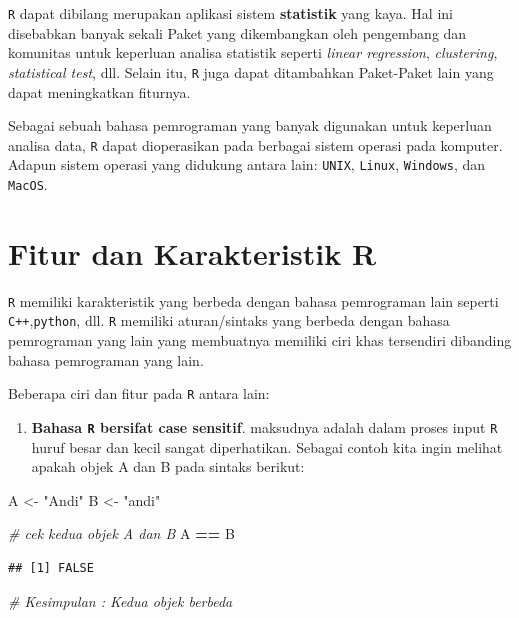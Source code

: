 \documentclass[]{book}
\newenvironment{Shaded}{\begin{snugshade}}{\end{snugshade}}
\newcommand{\CommentTok}[1]{\textcolor[rgb]{0.56,0.35,0.01}{\textit{#1}}}
\newcommand{\NormalTok}[1]{#1}
\newcommand{\OperatorTok}[1]{\textcolor[rgb]{0.81,0.36,0.00}{\textbf{#1}}}
\newcommand{\StringTok}[1]{\textcolor[rgb]{0.31,0.60,0.02}{#1}}
\providecommand{\tightlist}{%
  \setlength{\itemsep}{0pt}\setlength{\parskip}{0pt}}
\theoremstyle{definition}
\theoremstyle{definition}
\theoremstyle{definition}
\theoremstyle{remark}
\begin{document}
\texttt{R} dapat dibilang merupakan aplikasi sistem \textbf{statistik} yang kaya. Hal ini disebabkan banyak sekali Paket yang dikembangkan oleh pengembang dan komunitas untuk keperluan analisa statistik seperti \emph{linear regression}, \emph{clustering}, \emph{statistical test}, dll. Selain itu, \texttt{R} juga dapat ditambahkan Paket-Paket lain yang dapat meningkatkan fiturnya.

Sebagai sebuah bahasa pemrograman yang banyak digunakan untuk keperluan analisa data, \texttt{R} dapat dioperasikan pada berbagai sistem operasi pada komputer. Adapun sistem operasi yang didukung antara lain: \texttt{UNIX}, \texttt{Linux}, \texttt{Windows}, dan \texttt{MacOS}.

\hypertarget{fiturR}{%
\section{Fitur dan Karakteristik R}\label{fiturR}}

\texttt{R} memiliki karakteristik yang berbeda dengan bahasa pemrograman lain seperti \texttt{C++},\texttt{python}, dll. \texttt{R} memiliki aturan/sintaks yang berbeda dengan bahasa pemrograman yang lain yang membuatnya memiliki ciri khas tersendiri dibanding bahasa pemrograman yang lain.

Beberapa ciri dan fitur pada \texttt{R} antara lain:

\begin{enumerate}
\def\labelenumi{\arabic{enumi}.}
\tightlist
\item
  \textbf{Bahasa \texttt{R} bersifat case sensitif}. maksudnya adalah dalam proses input \texttt{R} huruf besar dan kecil sangat diperhatikan. Sebagai contoh kita ingin melihat apakah objek A dan B pada sintaks berikut:
\end{enumerate}

\begin{Shaded}
\begin{Highlighting}[]
\NormalTok{A <-}\StringTok{ "Andi"}
\NormalTok{B <-}\StringTok{ "andi"}

\CommentTok{# cek kedua objek A dan B}
\NormalTok{A }\OperatorTok{==}\StringTok{ }\NormalTok{B}
\end{Highlighting}
\end{Shaded}

\begin{verbatim}
## [1] FALSE
\end{verbatim}

\begin{Shaded}
\begin{Highlighting}[]
\CommentTok{# Kesimpulan : Kedua objek berbeda}
\end{Highlighting}
\end{Shaded}
\end{document}
